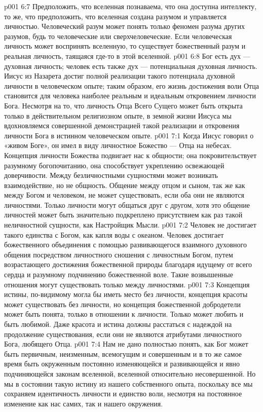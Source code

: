 \vs p001 6:7 \pc Предположить, что вселенная познаваема, что она доступна интеллекту, то же, что предположить, что вселенная создана разумом и управляется личностью. Человеческий разум может понять только феномен разума других разумов, будь то человеческие или сверхчеловеческие. Если человеческая личность может воспринять вселенную, то существует божественный разум и реальная личность, таящаяся где\hyp{}то в этой вселенной.
\vs p001 6:8 \pc Бог есть дух --- духовная личность; человек есть также дух --- потенциальная духовная личность. Иисус из Назарета достиг полной реализации такого потенциала духовной личности в человеческом опыте; таким образом, его жизнь достижения воли Отца становится для человека наиболее реальным и идеальным откровением личности Бога. Несмотря на то, что личность Отца Всего Сущего может быть открыта только в действительном религиозном опыте, в земной жизни Иисуса мы вдохновляемся совершенной демонстрацией такой реализации и откровения личности Бога в истинном человеческом опыте.
\vs p001 7:1 Когда Иисус говорил о «живом Боге», он имел в виду личностное Божество --- Отца на небесах. Концепция личности Божества подвигает нас к общности; она покровительствует разумному богопочитанию, она способствует укреплению освежающей доверчивости. Между безличностными сущностями может возникать взаимодействие, но не общность. Общение между отцом и сыном, так же как между Богом и человеком, не может существовать, если оба они не являются личностями. Только личности могут общаться друг с другом, хотя это общение личностей может быть значительно подкреплено присутствием как раз такой неличностной сущности, как Настройщик Мысли.
\vs p001 7:2 Человек не достигает такого единства с Богом, как капля воды с океаном. Человек достигает божественного объединения с помощью развивающегося взаимного духовного общения посредством личностного сношения с личностным Богом, путем возрастающего достижения божественной природы благодаря идущему от всего сердца и разумному подчинению божественной воле. Такие возвышенные отношения могут существовать только между личностями.
\vs p001 7:3 \pc Концепция истины, по\hyp{}видимому могла бы иметь место без личности, концепция красоты может существовать без личности, но концепция божественной добродетели может быть понята, только в отношении к личности. Только  может любить и быть любимой. Даже красота и истина должны расстаться с надеждой на продолжение существования, если они не являются атрибутами личностного Бога, любящего Отца.
\vs p001 7:4 \pc Нам не дано полностью понять, как Бог может быть первичным, неизменным, всемогущим и совершенным и в то же самое время быть окруженным постоянно изменяющейся и развивающейся и явно подчиняющейся законам вселенной, вселенной относительно несовершенной. Но мы в состоянии  такую истину из нашего собственного опыта, поскольку все мы сохраняем идентичность личности и единство воли, несмотря на постоянное изменение как нас самих, так и нашего окружения.
